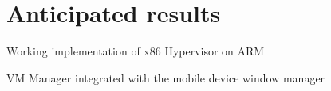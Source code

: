 \section{Anticipated results}
	\begin{itemize*}
	\item Working implementation of x86 Hypervisor on ARM
	\item VM Manager integrated with the mobile device window manager 
	\end{itemize*}

